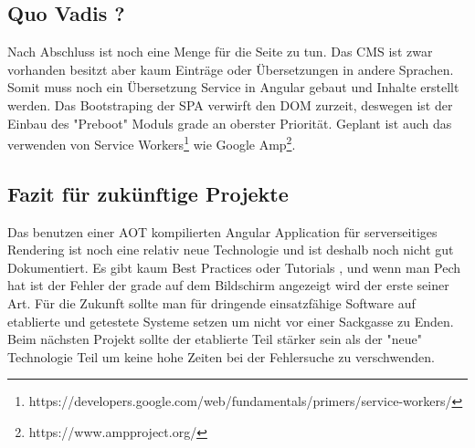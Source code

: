 \documentclass[11pt,a4paper]{article}
\begin{document}
\subsection{Quo Vadis ?}
Nach Abschluss ist noch eine Menge für die Seite zu tun.
Das CMS  ist zwar vorhanden besitzt aber kaum Einträge oder Übersetzungen in andere Sprachen.
Somit muss noch ein Übersetzung Service in Angular gebaut und Inhalte erstellt werden. Das Bootstraping der SPA verwirft den DOM zurzeit, deswegen ist der Einbau des "Preboot" Moduls grade an oberster Priorität. Geplant ist auch das verwenden von Service Workers\footnote{https://developers.google.com/web/fundamentals/primers/service-workers/} wie Google Amp\footnote{https://www.ampproject.org/}. 
\subsection{Fazit für zukünftige Projekte}
Das benutzen einer AOT kompilierten Angular Application für serverseitiges Rendering ist noch eine relativ neue Technologie und ist deshalb noch nicht gut Dokumentiert. Es gibt kaum Best Practices oder Tutorials , und wenn man Pech hat ist der Fehler der grade auf dem Bildschirm angezeigt wird der erste seiner Art. Für die Zukunft sollte man für dringende einsatzfähige Software auf etablierte und getestete Systeme setzen um nicht vor einer Sackgasse zu Enden. Beim nächsten Projekt sollte der etablierte Teil stärker sein als der "neue" Technologie Teil um keine hohe Zeiten bei der Fehlersuche  zu verschwenden.
\end{document}
